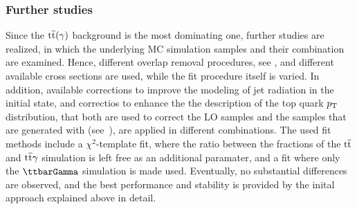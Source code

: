 \subsubsection*{Further studies}
Since the ${\mathrm{t}\overline{\mathrm{t}}}(\gamma)$ background is the most dominating one, further studies are realized, in which the underlying MC simulation samples and their combination are examined. Hence, different overlap removal procedures, see , and different available cross sections are used, while the fit procedure itself is varied. In addition, available corrections to improve the modeling of jet radiation in the initial state, and correctios to enhance the the description of the top quark $p_{\mathrm{T}}$ distribution, that both are used to correct the LO samples and the samples that are generated with \POWHEG (see~), are applied in different combinations. The used fit methods include a $\chi^2$-template fit, where the ratio between the fractions of the ${\mathrm{t}\overline{\mathrm{t}}}$ and ${\mathrm{t}\overline{\mathrm{t}}}\gamma$ simulation is left free as an additional paramater, and a fit where only the $\ttbarGamma$ simulation is made used. Eventually, no substantial differences are observed, and the best performance and stability is provided by the inital approach explained above in detail.



